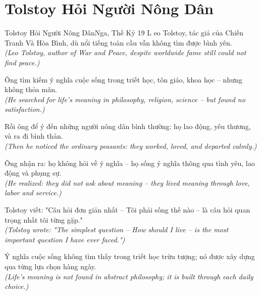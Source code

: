 \section{Tolstoy Hỏi Người Nông Dân}
\begin{truyen}{Tolstoy Hỏi Người Nông Dân}{Nga, Thế Kỷ 19}
L eo Tolstoy, tác giả của Chiến Tranh Và Hòa Bình, dù nổi tiếng toàn cầu vẫn không tìm được bình yên.\\
\textit{(Leo Tolstoy, author of War and Peace, despite worldwide fame still could not find peace.)}

Ông tìm kiếm ý nghĩa cuộc sống trong triết học, tôn giáo, khoa học -- nhưng không thỏa mãn.\\
\textit{(He searched for life's meaning in philosophy, religion, science -- but found no satisfaction.)}

Rồi ông để ý đến những người nông dân bình thường: họ lao động, yêu thương, và ra đi bình thản.\\
\textit{(Then he noticed the ordinary peasants: they worked, loved, and departed calmly.)}

Ông nhận ra: họ không hỏi về ý nghĩa -- họ sống ý nghĩa thông qua tình yêu, lao động và phụng sự.\\
\textit{(He realized: they did not ask about meaning -- they lived meaning through love, labor and service.)}

Tolstoy viết: "Câu hỏi đơn giản nhất -- Tôi phải sống thế nào -- là câu hỏi quan trọng nhất tôi từng gặp."\\
\textit{(Tolstoy wrote: "The simplest question -- How should I live -- is the most important question I have ever faced.")}

\end{truyen}
\begin{baihoc}
  Ý nghĩa cuộc sống không tìm thấy trong triết học trừu tượng; nó được xây dựng qua từng lựa chọn hàng ngày.\\
  \textit{(Life's meaning is not found in abstract philosophy; it is built through each daily choice.)}
\end{baihoc}

